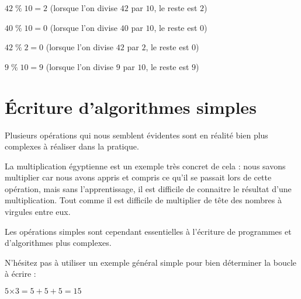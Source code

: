 \documentclass[11pt,a4paper]{article}
\begin{document}
$ 42 \; \% \; 10 = 2 $ (lorsque l'on divise $ 42 $ par $ 10 $, le reste est $ 2 $)

$ 40 \; \% \; 10 = 0 $ (lorsque l'on divise $ 40 $ par $ 10 $, le reste est $ 0 $)

$ 42 \; \% \; 2 = 0 $ (lorsque l'on divise $ 42 $ par $ 2 $, le reste est $ 0 $)

$ 9 \; \% \; 10 = 9 $ (lorsque l'on divise $ 9 $ par $ 10 $, le reste est $ 9 $)


\vfillLast

\newpage


\section{\'Ecriture d'algorithmes simples}

\bigskip

Plusieurs opérations qui nous semblent évidentes sont en réalité bien plus complexes à réaliser dans la pratique.

La multiplication égyptienne est un exemple très concret de cela : nous savons multiplier car nous avons appris et compris ce qu'il se passait lors de cette opération, mais sans l'apprentissage, il est difficile de connaitre le résultat d'une multiplication.
Tout comme il est difficile de multiplier de tête des nombres à virgules entre eux.

Les opérations simples sont cependant essentielles à l'écriture de programmes et d'algorithmes plus complexes.

\bigskip

\vspace*{3cm}

\bigskip


\bigskip

\vspace*{0.5cm}

\bigskip

N'hésitez pas à utiliser un exemple général simple pour bien déterminer la boucle à écrire :
\begin{center}

$ 5 \text{×} 3 = 5 + 5 + 5 = 15 $

\end{center}
\end{document}
